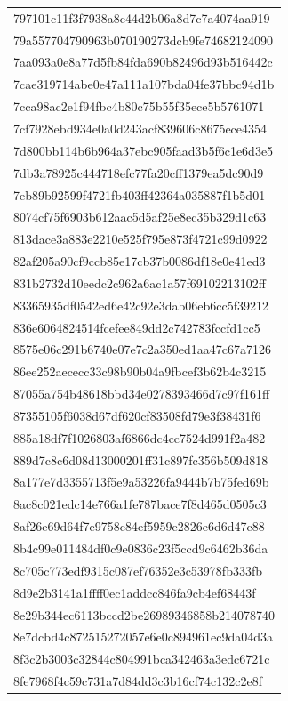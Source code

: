 \begin{tabular}{l}
797101c11f3f7938a8c44d2b06a8d7c7a4074aa919 \\
79a557704790963b070190273dcb9fe74682124090 \\
7aa093a0e8a77d5fb84fda690b82496d93b516442c \\
7cae319714abe0e47a111a107bda04fe37bbc94d1b \\
7cca98ac2e1f94fbc4b80c75b55f35ece5b5761071 \\
7cf7928ebd934e0a0d243acf839606c8675ece4354 \\
7d800bb114b6b964a37ebc905faad3b5f6c1e6d3e5 \\
7db3a78925c444718efc77fa20cff1379ea5dc90d9 \\
7eb89b92599f4721fb403ff42364a035887f1b5d01 \\
8074cf75f6903b612aac5d5af25e8ec35b329d1c63 \\
813dace3a883e2210e525f795e873f4721c99d0922 \\
82af205a90cf9ccb85e17cb37b0086df18e0e41ed3 \\
831b2732d10eedc2c962a6ac1a57f69102213102ff \\
83365935df0542ed6e42c92e3dab06eb6cc5f39212 \\
836e6064824514fcefee849dd2c742783fccfd1cc5 \\
8575e06c291b6740e07e7c2a350ed1aa47c67a7126 \\
86ee252aececc33c98b90b04a9fbcef3b62b4c3215 \\
87055a754b48618bbd34e0278393466d7c97f161ff \\
87355105f6038d67df620cf83508fd79e3f38431f6 \\
885a18df7f1026803af6866dc4cc7524d991f2a482 \\
889d7c8c6d08d13000201ff31c897fc356b509d818 \\
8a177e7d3355713f5e9a53226fa9444b7b75fed69b \\
8ac8c021edc14e766a1fe787bace7f8d465d0505c3 \\
8af26e69d64f7e9758c84ef5959e2826e6d6d47c88 \\
8b4c99e011484df0c9e0836c23f5ccd9c6462b36da \\
8c705c773edf9315c087ef76352e3c53978fb333fb \\
8d9e2b3141a1ffff0ec1addcc846fa9cb4ef68443f \\
8e29b344ec6113bccd2be26989346858b214078740 \\
8e7dcbd4c872515272057e6e0c894961ec9da04d3a \\
8f3c2b3003c32844c804991bca342463a3edc6721c \\
8fe7968f4c59c731a7d84dd3c3b16cf74c132c2e8f \\

\end{tabular}
